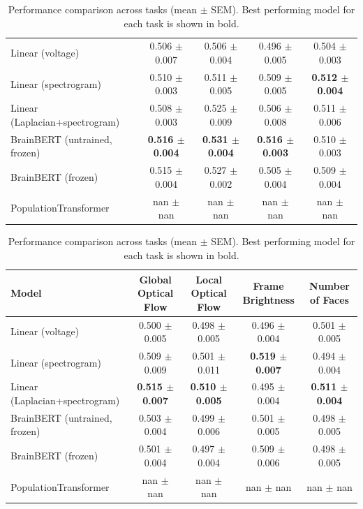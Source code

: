 \begin{table}[h]
\begin{tabular}{lcccc}
\hline
Linear (voltage) & 0.506 $\pm$ 0.007 & 0.506 $\pm$ 0.004 & 0.496 $\pm$ 0.005 & 0.504 $\pm$ 0.003 \\
Linear (spectrogram) & 0.510 $\pm$ 0.003 & 0.511 $\pm$ 0.005 & 0.509 $\pm$ 0.005 & \textbf{0.512 $\pm$ 0.004} \\
Linear (Laplacian+spectrogram) & 0.508 $\pm$ 0.003 & 0.525 $\pm$ 0.009 & 0.506 $\pm$ 0.008 & 0.511 $\pm$ 0.006 \\
BrainBERT (untrained, frozen) & \textbf{0.516 $\pm$ 0.004} & \textbf{0.531 $\pm$ 0.004} & \textbf{0.516 $\pm$ 0.003} & 0.510 $\pm$ 0.003 \\
BrainBERT (frozen) & 0.515 $\pm$ 0.004 & 0.527 $\pm$ 0.002 & 0.505 $\pm$ 0.004 & 0.509 $\pm$ 0.004 \\
PopulationTransformer & nan $\pm$ nan & nan $\pm$ nan & nan $\pm$ nan & nan $\pm$ nan \\
\hline
\end{tabular}
\hspace{1em}
\begin{tabular}{lcccc}
\hline
Model & Global Optical Flow & Local Optical Flow & Frame Brightness & Number of Faces \\
\hline
Linear (voltage) & 0.500 $\pm$ 0.005 & 0.498 $\pm$ 0.005 & 0.496 $\pm$ 0.004 & 0.501 $\pm$ 0.005 \\
Linear (spectrogram) & 0.509 $\pm$ 0.009 & 0.501 $\pm$ 0.011 & \textbf{0.519 $\pm$ 0.007} & 0.494 $\pm$ 0.004 \\
Linear (Laplacian+spectrogram) & \textbf{0.515 $\pm$ 0.007} & \textbf{0.510 $\pm$ 0.005} & 0.495 $\pm$ 0.004 & \textbf{0.511 $\pm$ 0.004} \\
BrainBERT (untrained, frozen) & 0.503 $\pm$ 0.004 & 0.499 $\pm$ 0.006 & 0.501 $\pm$ 0.005 & 0.498 $\pm$ 0.005 \\
BrainBERT (frozen) & 0.501 $\pm$ 0.004 & 0.497 $\pm$ 0.004 & 0.509 $\pm$ 0.006 & 0.498 $\pm$ 0.005 \\
PopulationTransformer & nan $\pm$ nan & nan $\pm$ nan & nan $\pm$ nan & nan $\pm$ nan \\
\hline
\end{tabular}
\caption{Performance comparison across tasks (mean $\pm$ SEM). Best performing model for each task is shown in bold.}
\label{tab:performance_comparison}
\end{table}
